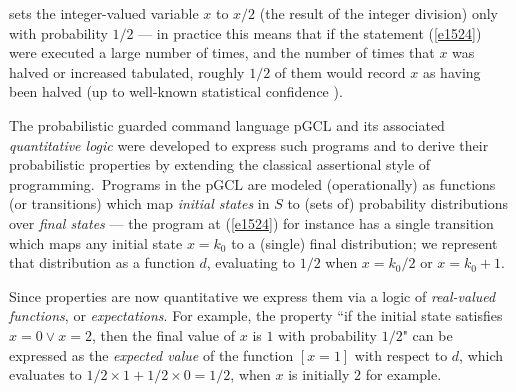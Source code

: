 \documentclass[numbers,copyright,creativecommons]{eptcs}
\newcommand{\Eqn}[1]{(\ref{#1})}
\newcommand{\pGCL}{\mbox{pGCL}}
\begin{document}
sets the integer-valued variable $x$ to $x/2$ (the result of the integer division) only with probability $1/2$ --- in practice
this means that
if the statement \Eqn{e1524} were executed a large number of times, and the number of times that $x$ was halved or increased  tabulated,
roughly $1/2$ of them would record $x$ as having been halved
 (up to well-known statistical confidence \cite{GW86}).

The probabilistic guarded command language $\pGCL$ \cite{ARP}  and its associated \emph{quantitative logic}
were developed to express such programs and to derive their probabilistic
properties by extending the classical assertional style of programming.\ Programs in the $\pGCL$
are modeled (operationally) as functions (or transitions) which
map \emph{initial states} in $S$
 to (sets of) probability distributions over \emph{final states} ---
 the program at \Eqn{e1524}
for instance has a single transition
 which
 maps any initial state $x=k_0$ to a (single) final distribution; we represent that distribution as a
 function $d$, evaluating to $1/2$ when $x=k_0/2$ or $x=k_0{+}1$.

Since properties are now quantitative we express them via  a logic of
\emph{real-valued functions}, or \emph{expectations}.
   For example,
 the property ``if the initial state satisfies $x=0\lor x=2$, then the final value of $x$ is $1$ with probability $1/2$"
can be expressed as the \emph{expected value} of
the function $[x=1]$
with respect to $d$, which evaluates to
$1/2 \times 1 + 1/2 \times 0 = 1/2$, when $x$ is initially $2$ for example.
\end{document}
